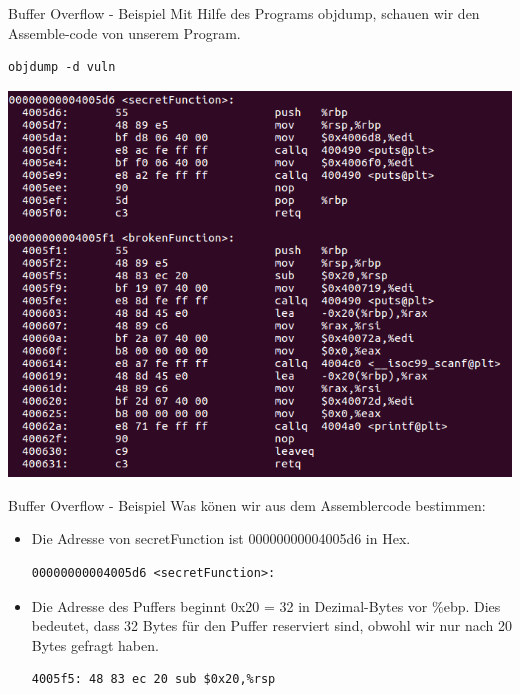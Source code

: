 \documentclass[10pt]{beamer}
\begin{document}
\begin{frame}[fragile]{Buffer Overflow - Beispiel}
  Mit Hilfe des Programs objdump, schauen wir den Assemble-code von unserem Program.

  \begin{lstlisting}[style=C2Style]
    objdump -d vuln
  \end{lstlisting}

  \includegraphics[width=\textwidth]{buffer-1.png}
\end{frame}

\begin{frame}[fragile]{Buffer Overflow - Beispiel}
  Was k\"onen wir aus dem Assemblercode bestimmen:

  \begin{itemize}
    \item Die Adresse von secretFunction ist 00000000004005d6 in Hex.
    \begin{lstlisting}[style=C2Style]
      00000000004005d6 <secretFunction>:
    \end{lstlisting}
    \item Die Adresse des Puffers beginnt 0x20 = 32 in Dezimal-Bytes vor \%ebp. Dies bedeutet, dass 32 Bytes f\"ur den Puffer reserviert sind, obwohl wir nur nach 20 Bytes gefragt haben.
    \begin{lstlisting}[style=C2Style]
      4005f5: 48 83 ec 20 sub $0x20,%rsp
    \end{lstlisting}
  \end{itemize}

\end{frame}
\end{document}
